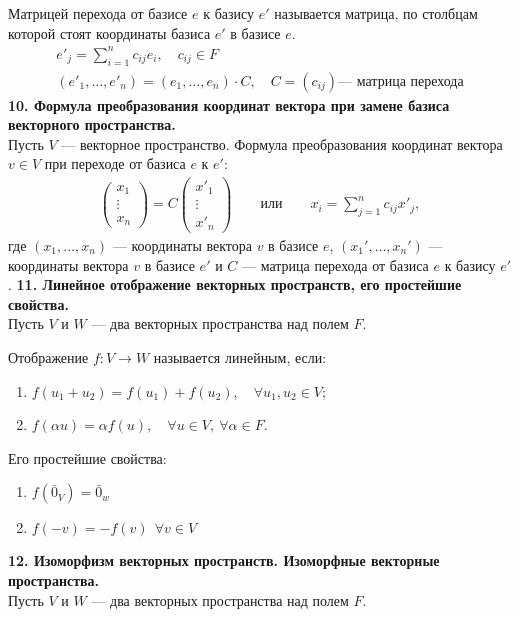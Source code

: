 \documentclass{article}
\begin{document}
Матрицей перехода от базисе $e$ к базису $e'$ называется матрица, по столбцам которой стоят координаты базиса $e'$ в базисе $e$.
\begin{gather*}
e'_j = \sum_{i = 1}^{n} c_{ij}e_i, \quad c_{ij} \in F \\
(e'_1, \ldots, e'_n) = (e_1, \ldots, e_n) \cdot C, \quad C = (c_{ij}) \text{--- матрица перехода}
\end{gather*}
\newline
\newline
\textbf{10. Формула преобразования координат вектора при замене базиса векторного пространства.}\\
Пусть $V$ --- векторное пространство. Формула преобразования координат вектора $v \in V$ при переходе от базиса $e$ к $e'$:
\begin{gather*}
\begin{pmatrix}
x_1 \\
\vdots \\
x_n
\end{pmatrix}
= C 
\begin{pmatrix}
x'_1 \\
\vdots \\
x'_n
\end{pmatrix}
\qquad \text{или} \qquad
x_i = \sum_{j = 1}^{n}c_{ij}x'_j,
\end{gather*}
где $(x_1, \ldots, x_n)$ --- координаты вектора $v$ в базисе $e $, $(x_1', \ldots, x_n')$ --- координаты вектора $v$  в базисе $e '$ и $C$ --- матрица перехода от базиса $e $ к базису $e '$.
\newline
\newline
\textbf{11. Линейное отображение векторных пространств, его простейшие свойства.}\\
Пусть $V$ и $W$ --- два векторных пространства над полем $F$.

Отображение $f : V \rightarrow W$ называется линейным, если:
\begin{enumerate}
\item $f(u_1 + u_2) = f(u_1) + f(u_2), \quad \forall u_1, u_2 \in V$;
\item $f(\alpha u) = \alpha f(u), \quad \forall u \in V,\ \forall \alpha \in F$.
\end{enumerate}
Его простейшие свойства:
\begin{enumerate}
     \item $f(\bar{0}_V)=\bar{0}_w$
     \item $f(-v) = -f(v) ~~\forall v \in V$
\end{enumerate}
\textbf{12. Изоморфизм векторных пространств. Изоморфные векторные пространства.}\\
Пусть $V$ и $W$ --- два векторных пространства над полем $F$.
\end{document}
